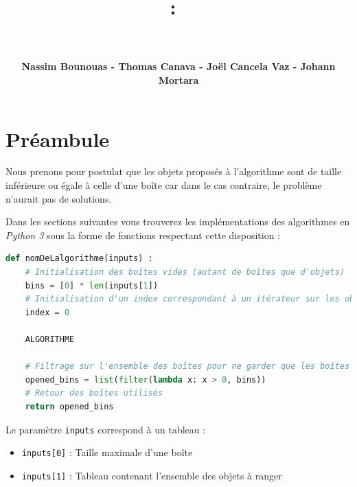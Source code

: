 \documentclass{article}
\title{
\vspace{2in}
\textmd{\textbf{\hmwkClass :\ \hmwkTitle}}\\
\vspace{0.2in}\Large{\textit{\ \hmwkDueDate}}
\vspace{3in}
}
\author{\textbf{Nassim Bounouas - Thomas Canava - Joël Cancela Vaz - Johann Mortara}}
\date{} %
\begin{document}
\maketitle



\newpage
{}
\tableofcontents
\newpage

\section{Préambule}
Nous prenons pour postulat que les objets proposés à l'algorithme sont de taille inférieure ou égale à celle d'une boîte car dans le cas contraire, le problème n'aurait pas
de solutions.

Dans les sections suivantes vous trouverez les implémentations des algorithmes en \textit{Python 3} sous la forme de fonctions respectant cette disposition :

\begin{lstlisting}[language=Python, frame=single]
def nomDeLalgorithme(inputs) :
    # Initialisation des boîtes vides (autant de boîtes que d'objets)
    bins = [0] * len(inputs[1])
    # Initialisation d'un index correspondant à un itérateur sur les objets
    index = 0

    ALGORITHME

    # Filtrage sur l'ensemble des boîtes pour ne garder que les boîtes utilisées
    opened_bins = list(filter(lambda x: x > 0, bins))
    # Retour des boîtes utilisés
    return opened_bins
\end{lstlisting}

Le paramètre \texttt{inputs} correspond à un tableau :
    \begin{itemize}
        \item \texttt{inputs[0]} :  Taille maximale d'une boîte
        \item \texttt{inputs[1]} :  Tableau contenant l'ensemble des objets à ranger
    \end{itemize}

\end{document}
